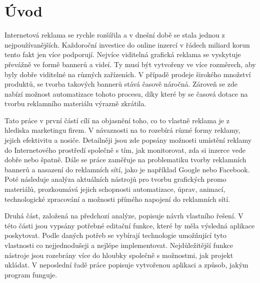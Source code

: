\chapter{Úvod}
\label{chap:Introduction}
Internetová reklama se rychle rozšířila a v dnešní době se stala jednou z nejpoužívanějších. Každoroční investice do online inzercí v řádech miliard korun tento fakt jen více podporují.
Nejvíce viditelná grafická reklama se vyskytuje převážně ve formě bannerů a videí. Ty musí být vytvořeny ve více rozměrech, aby byly dobře viditelné na různých zařízeních.
V případě prodeje širokého množství produktů, se tvorba takových bannerů stává časově náročná. Zároveň se zde nabízí možnost automatizace tohoto procesu, díky které by se 
časová dotace na tvorbu reklamního materiálu výrazně zkrátila.

Tato práce v první částí cílí na objasnění toho, co to vlastně reklama je z hlediska marketingu firem. V návaznosti na to rozebírá různé formy reklamy, jejich efektivitu
a nosiče. Detailněji jsou zde popsány možnosti umístění reklamy do Internetového prostředí společně s tím, jak monitorovat, zda si inzerce vede dobře nebo špatně.
Dále se práce zaměřuje na problematiku tvorby reklamních bannerů a nasazení do reklamních sítí, jako je například Google nebo Facebook. Poté následuje analýza aktuálních nástrojů pro tvorbu grafických promo materiálů, prozkoumává jejich schopnosti automatizace, úprav, animací, technologické zpracování a možnosti
přímého napojení do reklamních sítí.

Druhá část, založená na předchozí analýze, popisuje návrh vlastního řešení. V této části jsou vypsány potřebné editační funkce, které by měla výsledná aplikace poskytovat. Podle daných potřeb
se vybírají technologie umožňující tyto vlastnosti co nejjednodušeji a nejlépe implementovat. Nejdůležitější funkce nástroje jsou rozebrány více do hloubky společně s možnostmi,
jak projekt ukládat.
V neposlední řadě práce popisuje vytvořenou aplikaci a způsob, jakým program funguje.


\endinput